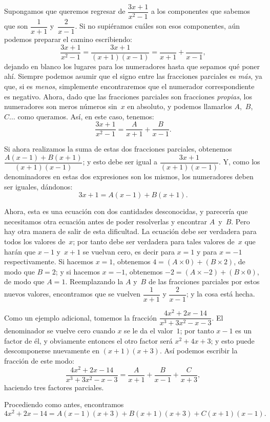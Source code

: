 \documentclass[12pt]{book}[2005/09/16]
\newcommand{\DPPageSep}[2]{\Pagelabel{#2}}
\newcommand{\Pagelabel}[1]
  {\phantomsection\label{#1}}
\begin{document}
Supongamos que queremos regresar de $\dfrac{3x+1}{x^2-1}$ a los
componentes que sabemos que son $\dfrac{1}{x+1}$ y~$\dfrac{2}{x-1}$. Si
no supiéramos cuáles son esos componentes, aún podemos
preparar el camino escribiendo:
\[
\frac{3x+1}{x^2-1} = \frac{3x+1}{(x+1)(x-1)} = \frac{}{x+1} + \frac{}{x-1},
\]
dejando en blanco los lugares para los numeradores hasta que
sepamos qué poner ahí. Siempre podemos asumir que el
signo entre las fracciones parciales es \emph{más}, ya que, si
es \emph{menos}, simplemente encontraremos que el numerador correspondiente
es negativo. Ahora, dado que las fracciones
parciales son fracciones \emph{propias}, los numeradores son
meros números sin~$x$ en absoluto, y podemos llamarlos
$A$,~$B$, $C\dots$ como queramos. Así, en este caso, tenemos:
\[
\frac{3x+1}{x^2-1} = \frac{A}{x+1} + \frac{B}{x-1}.
\]

Si ahora realizamos la suma de estas dos
fracciones parciales, obtenemos $\dfrac{A(x-1)+B(x+1)}{(x+1)(x-1)}$; y esto
debe ser igual a $\dfrac{3x+1}{(x+1)(x-1)}$. Y, como los denominadores
en estas dos expresiones son los mismos,
los numeradores deben ser iguales, dándonos:
\[
3x + 1 = A(x-1) + B(x + 1).
\]

Ahora, esta es una ecuación con dos cantidades
desconocidas, y parecería que necesitamos otra
ecuación antes de poder resolverlas y encontrar $A$~y~$B$.
\DPPageSep{136.png}{124}%
Pero hay otra manera de salir de esta dificultad. La
ecuación debe ser verdadera para todos los valores de~$x$; por tanto
debe ser verdadera para tales valores de~$x$ que harán que
$x-1$ y~$x+1$ se vuelvan cero, es decir para $x=1$ y
para $x=-1$ respectivamente. Si hacemos $x=1$, obtenemos
$4 = (A × 0)+(B × 2)$, de modo que $B=2$; y si hacemos
$x=-1$, obtenemos $-2 = (A × -2) + (B × 0)$, de modo que $A=1$.
Reemplazando la $A$ y~$B$ de las fracciones parciales por
estos nuevos valores, encontramos que se vuelven $\dfrac{1}{x+1}$ y
$\dfrac{2}{x-1}$; y la cosa está hecha.

Como un ejemplo adicional, tomemos la fracción
$\dfrac{4x^2 + 2x - 14}{x^3 + 3x^2 - x - 3}$. El denominador se vuelve cero cuando
$x$ se le da el valor~$1$; por tanto $x-1$ es un factor de él,
y obviamente entonces el otro factor será $x^2 + 4x + 3$;
y esto puede descomponerse nuevamente en $(x+1)(x+3)$.
Así podemos escribir la fracción de este modo:
\[
\frac{4x^2 + 2x - 14}{x^3 + 3x^2 - x - 3}
  = \frac{A}{x+1} + \frac{B}{x-1} + \frac{C}{x+3},
\]
haciendo tres factores parciales.

Procediendo como antes, encontramos
\[%
4x^2 + 2x - 14 = A(x-1)(x+3) + B(x+1)(x+3) + C(x+1)(x-1).
\]
\end{document}
